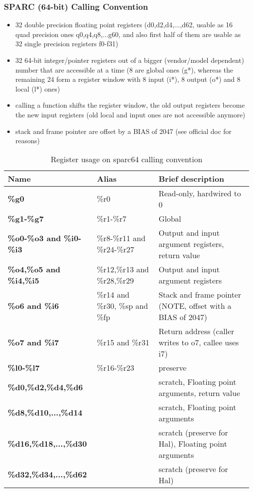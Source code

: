 \subsubsection{SPARC (64-bit) Calling Convention}

\begin{itemize}
\item 32 double precision floating point registers (d0,d2,d4,...,d62, usable as 16 quad precision ones q0,q4,q8,...g60, and also first half of them are usable as 32 single precision registers f0-f31)
\item 32 64-bit integer/pointer registers out of a bigger (vendor/model dependent) number that are accessible at a time (8 are global ones (g*), whereas the remaining 24 form a register window with 8 input (i*), 8 output (o*) and 8 local (l*) ones)
\item calling a function shifts the register window, the old output registers become the new input registers (old local and input ones are not accessible anymore)
\item stack and frame pointer are offset by a BIAS of 2047 (see official doc for reasons)
\end{itemize}

\begin{table}[h]
\begin{tabular*}{0.95\textwidth}{lll}
Name                          & Alias                          & Brief description\\
\hline
{\bf \%g0}                    & \%r0                           & Read-only, hardwired to 0 \\
{\bf \%g1-\%g7}               & \%r1-\%r7                      & Global \\
{\bf \%o0-\%o3 and \%i0-\%i3} & \%r8-\%r11 and \%r24-\%r27     & Output and input argument registers, return value \\
{\bf \%o4,\%o5 and \%i4,\%i5} & \%r12,\%r13 and \%r28,\%r29    & Output and input argument registers \\
{\bf \%o6 and \%i6}           & \%r14 and \%r30, \%sp and \%fp & Stack and frame pointer (NOTE, offset with a BIAS of 2047) \\
{\bf \%o7 and \%i7}           & \%r15 and \%r31                & Return address (caller writes to o7, callee uses i7) \\
{\bf \%l0-\%l7}               & \%r16-\%r23                    & preserve \\
{\bf \%d0,\%d2,\%d4,\%d6}     &                                & scratch, Floating point arguments, return value \\
{\bf \%d8,\%d10,...,\%d14}    &                                & scratch, Floating point arguments \\
{\bf \%d16,\%d18,...,\%d30}   &                                & scratch (preserve for Hal), Floating point arguments \\
{\bf \%d32,\%d34,...,\%d62}   &                                & scratch (preserve for Hal) \\
\end{tabular*}
\caption{Register usage on sparc64 calling convention}
\end{table}

